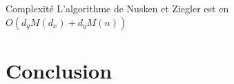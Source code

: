 \documentclass[10pt,a4paper]{beamer}
\begin{document}
\begin{frame}
    \begin{alertblock}{Complexité}
        L'algorithme de Nusken et Ziegler est en $O(d_yM(d_x) + d_yM(n))$
    \end{alertblock}
\end{frame}

\section{Conclusion}
\begin{frame}
    \tableofcontents[currentsection]
\end{frame}
\end{document}
